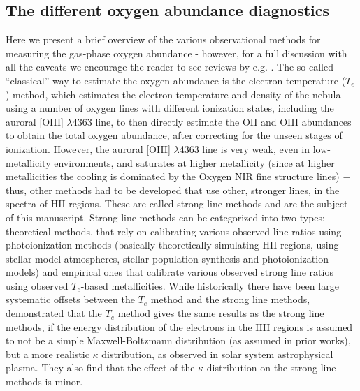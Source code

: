 \documentclass{emulateapj}
\begin{document}
\subsection{The different oxygen abundance diagnostics}
Here we present a brief overview of the various observational methods for measuring the gas-phase oxygen abundance - however, for a full discussion with all the caveats we encourage the reader to see reviews by e.g. \citet{stasinska02,kewley08,moustakas10,stasinska10,dopita13,blanc15}.
The so-called ``classical'' way to estimate the oxygen abundance is the electron temperature ($T_e$) method, which estimates the electron temperature and density of the nebula using a number of oxygen lines with different ionization states, including the auroral [OIII] $\lambda$4363 line, to then directly estimate the OII and OIII abundances to obtain the total oxygen abundance, after correcting for the unseen stages of ionization. However, the auroral [OIII] $\lambda$4363 line is very weak, even in low-metallicity environments, and saturates at higher metallicity (since at higher metallicities the cooling is dominated by the Oxygen NIR fine structure lines) $-$ thus, other methods had to be developed that use other, stronger lines, in the spectra of HII regions. These are called strong-line methods and are the subject of this manuscript. Strong-line methods can be categorized into two types: theoretical methods, that rely on calibrating various observed line ratios using photoionization methods (basically theoretically simulating HII regions, using stellar model atmospheres, stellar population synthesis and photoionization models) and empirical ones that calibrate various observed strong line ratios using observed $T_e$-based metallicities. While historically there have been large systematic offsets between the $T_e$ method and the strong line methods, \citet{dopita13} demonstrated that the $T_e$ method gives the same results as the strong line methods, if the energy distribution of the electrons in the HII regions is assumed to not be a simple Maxwell-Boltzmann distribution (as assumed in prior works), but a more realistic $\kappa$ distribution, as observed in solar system astrophysical plasma. They also find that the effect of the $\kappa$ distribution on the strong-line methods is minor.
\end{document}
